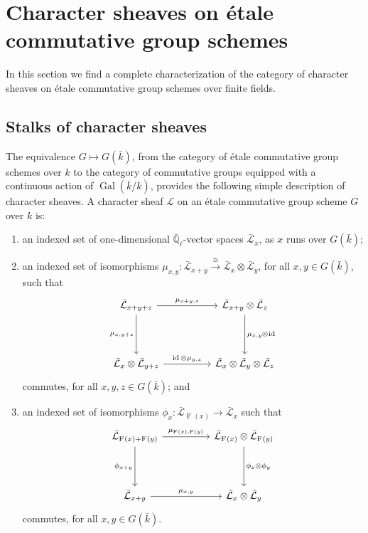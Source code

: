 \documentclass[10pt]{amsart}
\makeatletter
\theoremstyle{plain}
\theoremstyle{definition}
\theoremstyle{remark}
\newcommand{\EE}{\mathbb{\bar Q}_\ell}
\newcommand{\bFq}{\bar{k}}
\newcommand{\Fq}{k}
\DeclareMathOperator{\Gal}{Gal}
\newcommand{\Frob}[1]{\operatorname{F}_{#1}}
\DeclareMathOperator{\id}{id}
\newcommand{\iso}{{\ \cong\ }}
\newcommand{\cs}[1]{{\mathcal{#1}}}
\newcommand{\gcs}[1]{{\mathcal{\bar #1}}}
\newcommand{\labitem}[2]{
\def\@itemlabel{\textbf{#1}}
\item
\def\@currentlabel{#1}\label{#2}}
\newcommand{\tight}[3]{\hspace{-#1pt}{#2}\hspace{-#3pt}}
\makeatother
\begin{document}
\section{Character sheaves on \'etale commutative group schemes} \label{sec:etale}

In this section we find a complete characterization of the category of character sheaves on \'etale commutative group schemes over finite fields.

\subsection{Stalks of character sheaves}\label{ssec:stalks}

The equivalence $G \mapsto G(\bFq)$,
from the category of \'etale commutative group schemes over $\Fq$ to the category of commutative groups equipped
with a continuous action of $\Gal(\bFq/\Fq)$,
provides the following simple description of character sheaves.
%
A character sheaf $\cs{L}$ on an \'etale commutative group scheme $G$ over $\Fq$ is:
\begin{enumerate}
 \labitem{(cs.1)}{cs.1} an indexed set of one-dimensional
  $\EE$-vector spaces $\gcs{L}_x$, as $x$ runs over
  $G(\bFq)$;

 \labitem{(cs.2)}{cs.2} an indexed set of isomorphisms
  $\mu_{x,y} : \gcs{L}_{x+y} \xrightarrow{\iso} \gcs{L}_{x} \otimes\gcs{L}_{y}$,
  for all $x,y \in G(\bFq)$, such that
  \[
   \begin{tikzcd}[row sep=40]
    \gcs{L}_{x+y+z} \arrow{rr}{\mu_{x+y,z}} \arrow[swap]{d}{\mu_{x,y+z}}
    && \gcs{L}_{x+y}\otimes\gcs{L}_{z} \dar{\mu_{x,y} \tight{0.5}{\otimes}{1} \id} \\
    \gcs{L}_{x} \otimes\gcs{L}_{y+z} \arrow{rr}{\id \otimes\mu_{y,z}}
    && \gcs{L}_{x} \otimes\gcs{L}_{y} \otimes\gcs{L}_{z}
   \end{tikzcd}
  \]
  commutes, for all $x,y,z\in G(\bFq)$; and
 \labitem{(cs.3)}{cs.3} an indexed set of isomorphisms $\phi_{x} : \gcs{L}_{\Frob{}(x)} \to \gcs{L}_x$
  such that
  \[
   \begin{tikzcd}[row sep=40]
    \gcs{L}_{\Frob{}(x)+\Frob{}(y)} \arrow[swap]{d}{\phi_{x+y}} \arrow{rr}{\mu_{\Frob{}(x),\Frob{}(y)}}
    && \gcs{L}_{\Frob{}(x)}\otimes\gcs{L}_{\Frob{}(y)} \dar{\phi_x \tight{0}{\otimes}{0} \phi_y} \\
    \gcs{L}_{x+y} \arrow{rr}{\mu_{x,y}}
    && \gcs{L}_x \otimes\gcs{L}_y
   \end{tikzcd}
  \]
  commutes, for all $x,y\in G(\bFq)$.
\end{enumerate}
\end{document}
